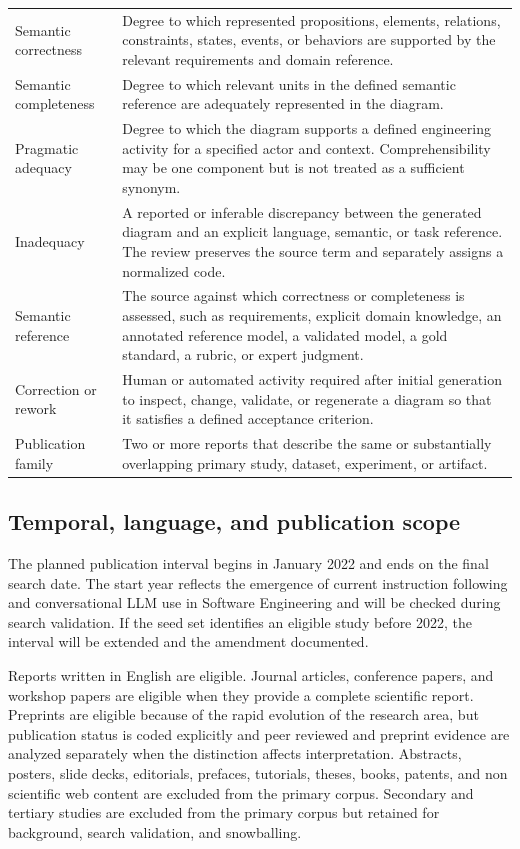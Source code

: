 \begin{longtable}{p{} p{}}
Semantic correctness & Degree to which represented propositions, elements, relations, constraints, states, events, or behaviors are supported by the relevant requirements and domain reference. \\
Semantic completeness & Degree to which relevant units in the defined semantic reference are adequately represented in the diagram. \\
Pragmatic adequacy & Degree to which the diagram supports a defined engineering activity for a specified actor and context. Comprehensibility may be one component but is not treated as a sufficient synonym. \\
Inadequacy & A reported or inferable discrepancy between the generated diagram and an explicit language, semantic, or task reference. The review preserves the source term and separately assigns a normalized code. \\
Semantic reference & The source against which correctness or completeness is assessed, such as requirements, explicit domain knowledge, an annotated reference model, a validated model, a gold standard, a rubric, or expert judgment. \\
Correction or rework & Human or automated activity required after initial generation to inspect, change, validate, or regenerate a diagram so that it satisfies a defined acceptance criterion. \\
Publication family & Two or more reports that describe the same or substantially overlapping primary study, dataset, experiment, or artifact. \\
\bottomrule
\end{longtable}

\subsection{Temporal, language, and publication scope}

The planned publication interval begins in January 2022 and ends on the final search date. The start year reflects the emergence of current instruction following and conversational LLM use in Software Engineering and will be checked during search validation. If the seed set identifies an eligible study before 2022, the interval will be extended and the amendment documented.

Reports written in English are eligible. Journal articles, conference papers, and workshop papers are eligible when they provide a complete scientific report. Preprints are eligible because of the rapid evolution of the research area, but publication status is coded explicitly and peer reviewed and preprint evidence are analyzed separately when the distinction affects interpretation. Abstracts, posters, slide decks, editorials, prefaces, tutorials, theses, books, patents, and non scientific web content are excluded from the primary corpus. Secondary and tertiary studies are excluded from the primary corpus but retained for background, search validation, and snowballing.

